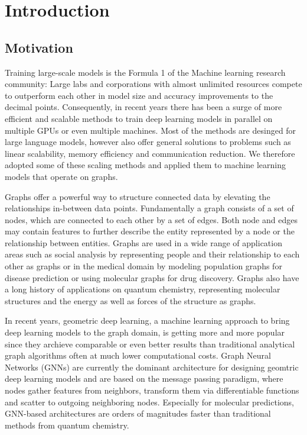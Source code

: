 \section{Introduction}

\subsection{Motivation}

Training large-scale models is the Formula 1 of the Machine learning research community: Large labs and corporations with 
almost unlimited resources compete to outperform each other in model size and accuracy improvements to the decimal points. 
Consequently, in recent years there has been a surge of more efficient and scalable methods to train deep learning models 
in parallel on multiple GPUs or even multiple machines. Most of the methods are desinged for large language models, however 
also offer general solutions to problems such as linear scalability, memory efficiency and 
communication reduction. We therefore adopted some of these scaling methods and applied them to machine learning models 
that operate on graphs. 

Graphs offer a powerful way to structure connected data by elevating the relationships in-between data points. 
Fundamentally a graph consists of a set of nodes, which are connected to each other by a set of edges. Both node 
and edges may contain features to further describe the entity represented by a node or the relationship between entities.
Graphs are used in a wide range of application areas such as social analysis by representing people and their relationship 
to each other as graphs or in the medical domain by modeling population graphs for disease prediction or using molecular graphs 
for drug discovery. Graphs also have a long history of applications on quantum chemistry, representing molecular 
structures and the energy as well as forces of the structure as graphs. 

In recent years, geometric deep learning, a machine learning approach to bring deep learning models 
to the graph domain, is getting more and more popular since they archieve comparable or even better 
results than traditional analytical graph algorithms often at much lower computational costs. Graph Neural 
Networks (GNNs) are currently the dominant architecture for designing geomtric deep learning models and 
are based on the message passing paradigm, where nodes gather features from neighbors, transform them via 
differentiable functions and scatter to outgoing neighboring nodes. Especially for molecular predictions, 
GNN-based architectures are orders of magnitudes faster than traditional methods from quantum chemistry. 

